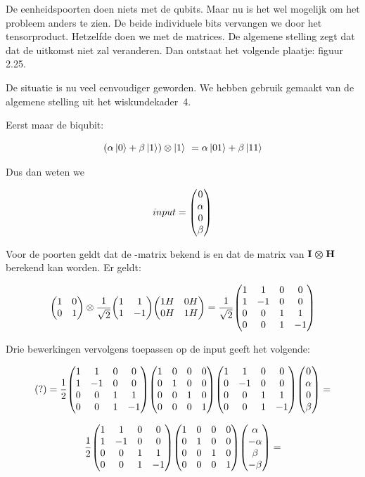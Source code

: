 \documentclass[../main.tex]{subfiles}
\begin{document}
De eenheidspoorten doen niets met de qubits. Maar nu is het wel mogelijk om het probleem anders te zien. De beide individuele bits vervangen we door het tensorproduct. Hetzelfde doen we met de matrices. De algemene stelling zegt dat dat de uitkomst niet zal veranderen.
Dan ontstaat het volgende plaatje: figuur 2.25.

De situatie is nu veel eenvoudiger geworden. We hebben gebruik gemaakt van de algemene stelling uit het wiskundekader~4. 

Eerst maar de biqubit: 


\[ (\alpha\ket{0}+\beta\ket{1}) \otimes \ket{1}\ = \alpha\ket{01}+\beta\ket{11}\]

Dus dan weten we 

\[ input=\mqty(0\\ \alpha\\0\\ \beta)\]

Voor de poorten geldt dat de -matrix bekend is en dat de matrix van $\port{I} \otimes\port{H}$ berekend kan worden. Er geldt:

\[ 
\mqty(1&0\\0&1)\otimes\frac{1}{\sqrt{2}}\mqty(1&1\\1&-1)
\mqty(1H&0H\\0H&1H)=\frac{1}{\sqrt{2}}
\mqty(1&1&0&0\\1&-1&0&0\\0&0&1&1\\0&0&1&-1)
\]

Drie bewerkingen vervolgens toepassen op de input geeft het volgende:

\[
(?)=\frac{1}{2}
\mqty(1&1&0&0\\1&-1&0&0\\0&0&1&1\\0&0&1&-1)
\mqty(1&0&0&0\\0&1&0&0\\0&0&1&0\\0&0&0&1)
\mqty(1&1&0&0\\0&-1&0&0\\0&0&1&1\\0&0&1&-1)
\mqty(0\\ \alpha\\0\\ \beta)=
\]


\[
\frac{1}{2}
\mqty(1&1&0&0\\1&-1&0&0\\0&0&1&1\\0&0&1&-1)
\mqty(1&0&0&0\\0&1&0&0\\0&0&1&0\\0&0&0&1)
\mqty(\alpha\\-\alpha\\ \beta\\-\beta)=
\]
\end{document}
